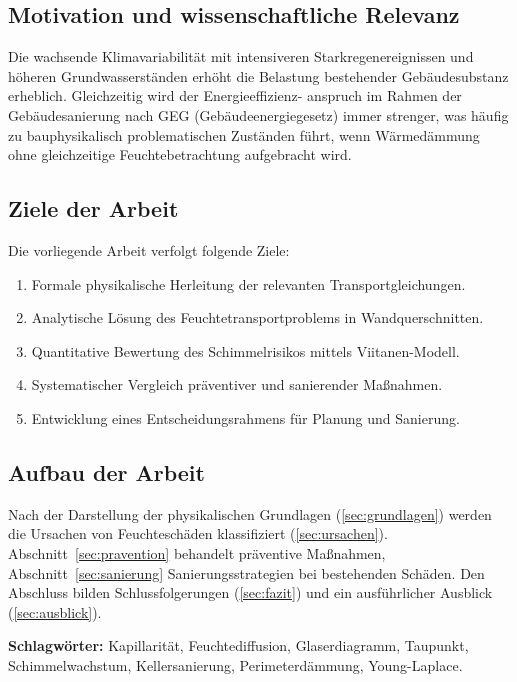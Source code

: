 ﻿\documentclass[a4paper,12pt]{article}
\theoremstyle{definition}
\begin{document}
\subsection{Motivation und wissenschaftliche Relevanz}

Die wachsende Klimavariabilit\"at mit intensiveren Starkregenereignissen
und h\"oheren Grundwasserst\"anden erh\"oht die Belastung bestehender
Geb\"audesubstanz erheblich. Gleichzeitig wird der Energieeffizienz-
anspruch im Rahmen der Geb\"audesanierung nach GEG (Geb\"audeenergiegesetz)
immer strenger, was h\"aufig zu bauphysikalisch problematischen Zust\"anden
f\"uhrt, wenn W\"armed\"ammung ohne gleichzeitige Feuchtebetrachtung
aufgebracht wird.

\subsection{Ziele der Arbeit}

Die vorliegende Arbeit verfolgt folgende Ziele:
\begin{enumerate}
  \item Formale physikalische Herleitung der relevanten Transportgleichungen.
  \item Analytische L\"osung des Feuchtetransportproblems in Wandquerschnitten.
  \item Quantitative Bewertung des Schimmelrisikos mittels Viitanen-Modell.
  \item Systematischer Vergleich pr\"aventiver und sanierender Ma\ss{}nahmen.
  \item Entwicklung eines Entscheidungsrahmens f\"ur Planung und Sanierung.
\end{enumerate}

\subsection{Aufbau der Arbeit}

Nach der Darstellung der physikalischen Grundlagen
(\cref{sec:grundlagen}) werden die Ursachen von
Feuchtesch\"aden klassifiziert (\cref{sec:ursachen}).
Abschnitt~\ref{sec:pravention} behandelt pr\"aventive Ma\ss{}nahmen,
Abschnitt~\ref{sec:sanierung} Sanierungsstrategien bei bestehenden
Sch\"aden. Den Abschluss bilden Schlussfolgerungen (\cref{sec:fazit})
und ein ausf\"uhrlicher Ausblick (\cref{sec:ausblick}).

\textbf{Schlagw\"orter:} Kapillarit\"at, Feuchtediffusion, Glaserdiagramm,
Taupunkt, Schimmelwachstum, Kellersanierung, Perimeterd\"ammung, Young-Laplace.
\end{document}
